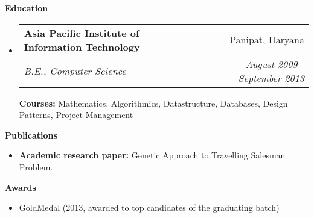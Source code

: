 \documentclass[letterpaper,11pt]{article}
\makeatletter
\newcommand{\resheading}[1]{{\large \colorbox{mygrey}{\begin{minipage}{\textwidth}{\textbf{#1 \vphantom{p\^{E}}}}\end{minipage}}}}
\newcommand{\ressubheadinged}[4]{
\begin{tabular*}{7.0in}{l@{\extracolsep{\fill}}r}
		\textbf{#1} & #2 \\
		\textit{#3} & \textit{#4}\\
\end{tabular*}\vspace{-6pt}}
\makeatother
\begin{document}
\resheading{Education}
\begin{itemize}
\item
	\ressubheadinged{Asia Pacific Institute of Information Technology}{Panipat, Haryana}{B.E., Computer Science}{August 2009 - September 2013}

\vspace{0.1in}

\textbf{Courses:} Mathematics, Algorithmics, Datastructure, Databases, Design Patterns, Project Management
\end{itemize}


\resheading{Publications}
\begin{itemize}
	\item {\bf  Academic research paper:} Genetic Approach to Travelling Salesman Problem.
\end{itemize}

\resheading{Awards}
\begin{itemize}
	\item GoldMedal (2013, awarded to top candidates of the graduating batch)
\end{itemize}
\end{document}
